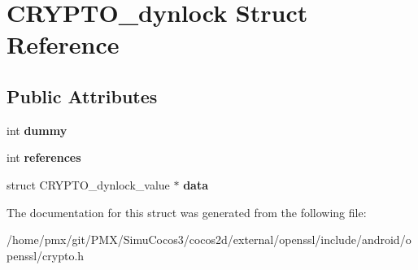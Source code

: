 \hypertarget{structCRYPTO__dynlock}{}\section{C\+R\+Y\+P\+T\+O\+\_\+dynlock Struct Reference}
\label{structCRYPTO__dynlock}
\subsection*{Public Attributes}
\begin{DoxyCompactItemize}
\item 
\mbox{\label{structCRYPTO__dynlock_a25d37ecc3002e51034e06bc1703d41e1}} 
int {\bfseries dummy}
\item 
\mbox{\label{structCRYPTO__dynlock_a5a29cc97b740faafbfc38aeb9b8e490d}} 
int {\bfseries references}
\item 
\mbox{\label{structCRYPTO__dynlock_ac80047787eba227e04a56ec05ea5e0f2}} 
struct C\+R\+Y\+P\+T\+O\+\_\+dynlock\+\_\+value $\ast$ {\bfseries data}
\end{DoxyCompactItemize}


The documentation for this struct was generated from the following file\+:\begin{DoxyCompactItemize}
\item 
/home/pmx/git/\+P\+M\+X/\+Simu\+Cocos3/cocos2d/external/openssl/include/android/openssl/crypto.\+h\end{DoxyCompactItemize}
